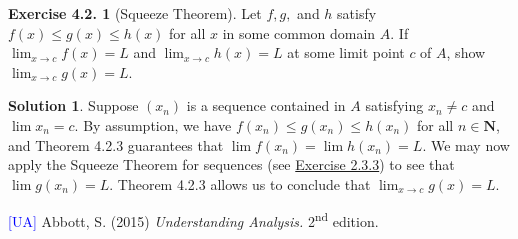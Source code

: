 \documentclass[12pt]{article}
\theoremstyle{definition}
\theoremstyle{exercise}
\newtheorem{exercise}{Exercise 4.2.}
\theoremstyle{solution}
\newtheorem*{solution}{Solution}
\newcommand{\ts}{\textsuperscript}
\newcommand{\N}{\mathbf{N}}
\begin{document}
\begin{exercise}[Squeeze Theorem]
\label{ex:11}
    Let \( f, g, \) and \( h \) satisfy \( f(x) \leq g(x) \leq h(x) \) for all \( x \) in some common domain \( A \). If \( \lim_{x \to c} f(x) = L \) and \( \lim_{x \to c} h(x) = L \) at some limit point \( c \) of \( A \), show \( \lim_{x \to c} g(x) = L \).
\end{exercise}

\begin{solution}
    Suppose \( (x_n) \) is a sequence contained in \( A \) satisfying \( x_n \neq c \) and \( \lim x_n = c \). By assumption, we have \( f(x_n) \leq g(x_n) \leq h(x_n) \) for all \( n \in \N \), and Theorem 4.2.3 guarantees that \( \lim f(x_n) = \lim h(x_n) = L \). We may now apply the Squeeze Theorem for sequences (see \href{https://lew98.github.io/Mathematics/UA_Section_2_3_Exercises.pdf}{Exercise 2.3.3}) to see that \( \lim g(x_n) = L \). Theorem 4.2.3 allows us to conclude that \( \lim_{x \to c} g(x) = L \).
\end{solution}

\noindent \hrulefill

\noindent \hypertarget{ua}{\textcolor{blue}{[UA]} Abbott, S. (2015) \textit{Understanding Analysis.} 2\ts{nd} edition.}
\end{document}
